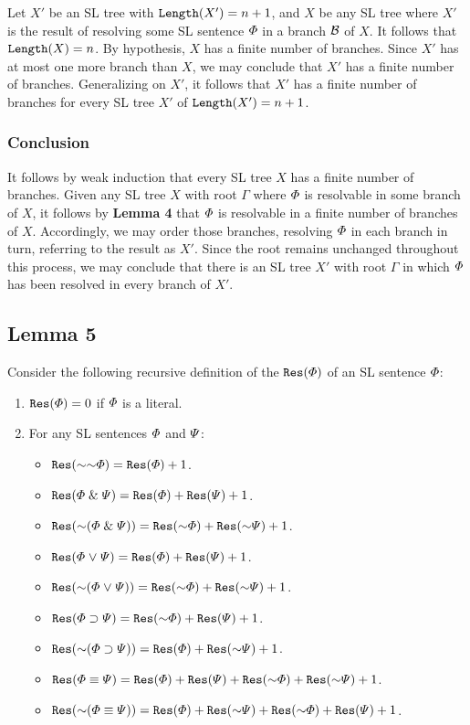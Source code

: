 Let $X'$ be an SL tree with $\texttt{Length}(X')=n+1$, and $X$ be any SL tree where $X'$ is the result of resolving some SL sentence $\varPhi$ in a branch $\mathcal{B}$ of $X$.
It follows that $\texttt{Length}(X)=n$.
By hypothesis, $X$ has a finite number of branches.
Since $X'$ has at most one more branch than $X$, we may conclude that $X'$ has a finite number of branches. 
Generalizing on $X'$, it follows that $X'$ has a finite number of branches for every SL tree $X'$ of $\texttt{Length}(X')=n+1$.




\subsubsection{Conclusion}

It follows by weak induction that every SL tree $X$ has a finite number of branches. 
Given any SL tree $X$ with root $\Gamma$ where $\varPhi$ is resolvable in some branch of $X$, it follows by \textbf{Lemma 4} that $\varPhi$ is resolvable in a finite number of branches of $X$.
Accordingly, we may order those branches, resolving $\varPhi$ in each branch in turn, referring to the result as $X'$. 
Since the root remains unchanged throughout this process, we may conclude that there is an SL tree $X'$ with root $\Gamma$ in which $\varPhi$ has been resolved in every branch of $X'$.



\subsection{Lemma 5}


Consider the following recursive definition of the  $\texttt{Res}(\varPhi)$ of an SL sentence $\varPhi$:

\begin{enumerate}
  \item $\texttt{Res}(\varPhi)=0$ if $\varPhi$ is a literal.
  \item For any SL sentences $\varPhi$ and $\varPsi$:
    \begin{itemize}
      \item $\res(\enot\enot\metaA)=\res(\metaA)+1$.
      \item $\texttt{Res}(\varPhi \mathrel\& \varPsi)=\texttt{Res}(\varPhi)+\texttt{Res}(\varPsi)+1$.
      \item $\res(\enot(\metaA \eand \metaB))=\res(\enot\metaA)+\res(\enot\metaB)+1$.
      \item $\texttt{Res}(\varPhi \mkern1mu\vee\mkern1mu \varPsi)=\texttt{Res}(\varPhi)+\texttt{Res}(\varPsi)+1$.
      \item $\res(\enot(\metaA \eor \metaB))=\res(\enot\metaA)+\res(\enot\metaB)+1$.
      \item $\res(\metaA \eif \metaB)=\res(\enot\metaA)+\res(\metaB)+1$.
      \item $\res(\enot(\metaA \eif \metaB))=\res(\metaA)+\res(\enot\metaB)+1$.
      \item $\res(\metaA \eiff \metaB)=\res(\metaA)+\res(\metaB) + \res(\enot\metaA)+\res(\enot\metaB)+1$.
      \item $\res(\enot(\metaA \eiff \metaB))=\res(\metaA) + \res(\enot\metaB) + \res(\enot\metaA)+\res(\metaB)+1$.
    \end{itemize}
\end{enumerate}

